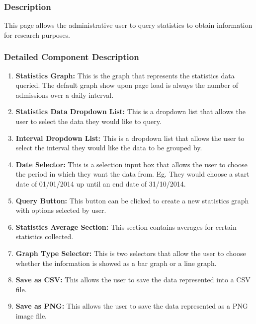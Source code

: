 \documentclass[14pt, a4paper]{article}
\begin{document}
	\subsubsection{Description} This page allows the administrative user to query statistics to obtain information for research purposes.
	\subsubsection{Detailed Component Description}
		\begin{enumerate}
			\item \textbf{Statistics Graph:} This is the graph that represents the statistics data queried. The default graph show upon page load is always the number of admissions over a daily interval. 
			\item \textbf{Statistics Data Dropdown List:} This is a dropdown list that allows the user to select the data they would like to query.
			\item \textbf{Interval Dropdown List:} This is a dropdown list that allows the user to select the interval they would like the data to be grouped by.
			\item \textbf{Date Selector:} This is a selection input box that allows the user to choose the period in which they want the data from. Eg. They would choose a start date of 01/01/2014 up until an end date of 31/10/2014.
			\item \textbf{Query Button:} This button can be clicked to create a new statistics graph with options selected by user.
			\item \textbf{Statistics Average Section:} This section contains averages for certain statistics collected.
			\item \textbf{Graph Type Selector: } This is two selectors that allow the user to choose whether the information is showed as a bar graph or a line graph.
			\item \textbf{Save as CSV:} This allows the user to save the data represented into a CSV file.
			\item \textbf{Save as PNG:} This allows the user to save the data represented as a PNG image file.
		\end{enumerate}
\end{document}
